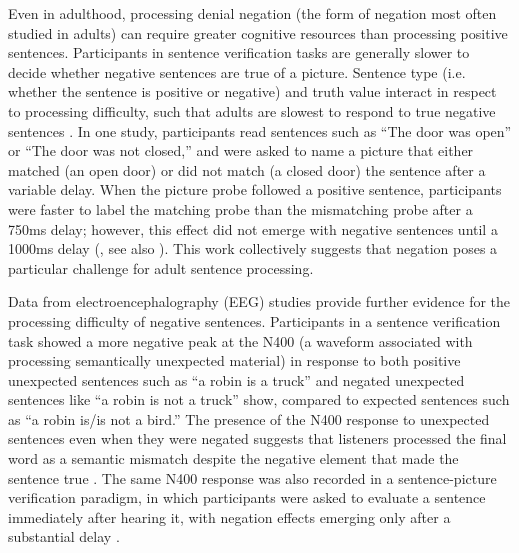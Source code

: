 \documentclass[man]{apa2}
\begin{document}
Even in adulthood, processing denial negation (the form of negation most often studied in adults) can require greater cognitive resources than processing positive sentences.  Participants in sentence verification tasks are generally slower to decide whether negative sentences are true of a picture.  Sentence type (i.e. whether the sentence is positive or negative) and truth value interact in respect to processing difficulty, such that adults are slowest to respond to true negative sentences \cite{hclark1972, just1971, just1976, carpenter1975}.  In one study, participants read sentences such as ``The door was open'' or ``The door was not closed,'' and were asked to name a picture that either matched (an open door) or did not match (a closed door) the sentence after a variable delay.  When the picture probe followed a positive sentence, participants were faster to label the matching probe than the mismatching probe after a 750ms delay; however, this effect did not emerge with negative sentences until a 1000ms delay (, see also ).  This work collectively suggests that negation poses a particular challenge for adult sentence processing.

Data from electroencephalography (EEG)  studies provide further evidence for the processing difficulty of negative sentences.  Participants in a sentence verification task showed a more negative peak at the N400 (a waveform associated with processing semantically unexpected material) in response to both positive unexpected sentences such as ``a robin is a truck'' and negated unexpected sentences like ``a robin is not a truck'' show, compared to expected sentences such as ``a robin is/is not a bird.''  The presence of the N400 response to unexpected sentences even when they were negated suggests that listeners processed the final word as a semantic mismatch despite the negative element that made the sentence true \cite{fischler1983}. The same N400 response was also recorded in a sentence-picture verification paradigm, in which participants were asked to evaluate a sentence immediately after hearing it, with negation effects emerging only after a substantial delay \cite{ludtke2008}.  
\end{document}
